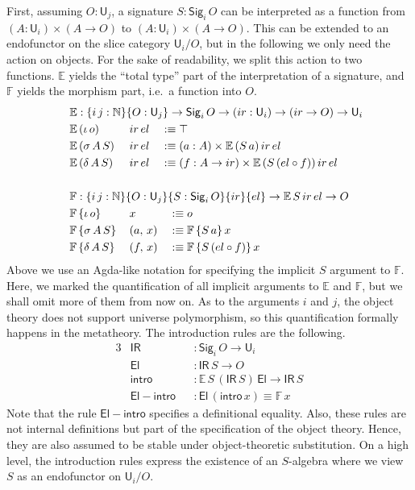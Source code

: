 \documentclass[acmsmall,screen,review]{acmart}
\newcommand{\msf}[1]{{\mathsf{#1}}}
\newcommand{\mbb}[1]{\mathbb{#1}}
\newcommand{\U}{\msf{U}}
\newcommand{\El}{\msf{El}}
\newcommand{\Sig}{\msf{Sig}}
\newcommand{\ir}{{ir}}
\newcommand{\el}{{el}}
\newcommand{\IR}{\msf{IR}}
\newcommand{\intro}{\msf{intro}}
\newcommand{\E}{\mbb{E}}
\newcommand{\F}{\mbb{F}}
\begin{document}
First, assuming $O : \U_j$, a signature $S : \Sig_i\,O$ can be interpreted as a function from $(A : \U_i) \times (A \to O)$ to
$(A : \U_i) \times (A \to O)$. This can be extended to an endofunctor on the slice category
$\U_i/O$, but in the following we only need the action on objects. For the sake of readability, we
split this action to two functions. $\E$ yields the ``total type'' part of the interpretation of a
signature, and $\F$ yields the morphism part, i.e.\ a function into $O$.
\begin{alignat*}{3}
  &\rlap{$\E : \{i\,j : \mbb{N}\}\{O : \U_j\} \to \Sig_i\,O \to (\ir : \U_i) \to (\ir \to O) \to \U_i$} \\
  &\E\,(\iota\,o)    \,&&\ir\,\el && \hspace{-0.7em}:\equiv \top\\
  &\E\,(\sigma\,A\,S)\,&&\ir\,\el && \hspace{-0.7em}:\equiv (a : A) \times \E\,(S\,a)\,\ir\,\el\\
  &\E\,(\delta\,A\,S)\,&&\ir\,\el && \hspace{-0.7em}:\equiv (f : A \to \ir) \times \E\,(S\,(\el \circ f))\,\ir\,\el\\
  & && &&\\
  &\rlap{$\F : \{i\,j : \mbb{N}\}\{O : \U_j\}\{S : \Sig_i\,O\}\{\ir\}\{\el\} \to \E\,S\,\ir\,\el \to O$} \\
  &\F\,\{\iota\,o\}    \,&&x       && :\equiv o\\
  &\F\,\{\sigma\,A\,S\}\,&&(a,\,x) && :\equiv \F\,\{S\,a\}\,x\\
  &\F\,\{\delta\,A\,S\}\,&&(f,\,x) && :\equiv \F\,\{S\,(\el \circ f)\}\,x
\end{alignat*}
Above we use an Agda-like notation for specifying the implicit $S$ argument to $\F$. Here, we marked
the quantification of all implicit arguments to $\E$ and $\F$, but we shall omit more of them from
now on. As to the arguments $i$ and $j$, the object theory does not support universe
polymorphism, so this quantification formally happens in the metatheory. The introduction
rules are the following.
\begin{alignat*}{3}
  &\IR                && : \Sig_i\,O \to \U_i\\
  &\El                && : \IR\,S \to O\\
  &\intro             && : \E\,S\,(\IR\,S)\,\El \to \IR\,S\\
  &\msf{El\!\!-\!\!intro} && : \El\,(\intro\,x) \equiv \F\,x
\end{alignat*}
Note that the rule $\msf{El\!\!-\!\!intro}$ specifies a definitional equality. Also, these rules are
not internal definitions but part of the specification of the object theory. Hence, they are also
assumed to be stable under object-theoretic substitution. On a high level, the introduction rules
express the existence of an $S$-algebra where we view $S$ as an endofunctor on $\U_i/O$.
\end{document}
